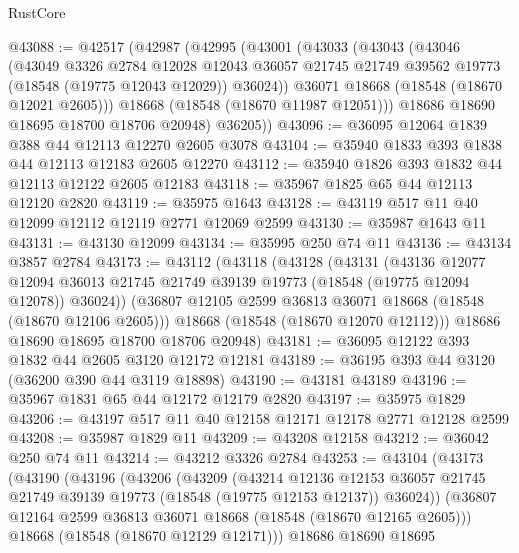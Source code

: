 \begin{lexlean}{RustCore}
\begin{coremodule}
@43088 := @42517
    (@42987
      (@42995
        (@43001
          (@43033
            (@43043
              (@43046
                (@43049
                  @3326
                  @2784
                  @12028
                  @12043
                  @36057
                  @21745
                  @21749
                  @39562
                  @19773
                  (@18548 (@19775 @12043 @12029))
                  @36024))
              @36071
              @18668
              (@18548 (@18670 @12021 @2605)))
            @18668
            (@18548 (@18670 @11987 @12051)))
          @18686
          @18690
          @18695
          @18700
          @18706
          @20948)
        @36205))
@43096 := @36095 @12064 @1839 @388 @44 @12113 @12270 @2605 @3078
@43104 := @35940 @1833 @393 @1838 @44 @12113 @12183 @2605 @12270
@43112 := @35940 @1826 @393 @1832 @44 @12113 @12122 @2605 @12183
@43118 := @35967 @1825 @65 @44 @12113 @12120 @2820
@43119 := @35975 @1643
@43128 := @43119 @517 @11 @40 @12099 @12112 @12119 @2771 @12069 @2599
@43130 := @35987 @1643 @11
@43131 := @43130 @12099
@43134 := @35995 @250 @74 @11
@43136 := @43134 @3857 @2784
@43173 := @43112
    (@43118
      (@43128
        (@43131
          (@43136
            @12077
            @12094
            @36013
            @21745
            @21749
            @39139
            @19773
            (@18548 (@19775 @12094 @12078))
            @36024))
        (@36807 @12105 @2599 @36813 @36071 @18668 (@18548 (@18670 @12106 @2605)))
        @18668
        (@18548 (@18670 @12070 @12112)))
      @18686
      @18690
      @18695
      @18700
      @18706
      @20948)
@43181 := @36095 @12122 @393 @1832 @44 @2605 @3120 @12172 @12181
@43189 := @36195 @393 @44 @3120 (@36200 @390 @44 @3119 @18898)
@43190 := @43181 @43189
@43196 := @35967 @1831 @65 @44 @12172 @12179 @2820
@43197 := @35975 @1829
@43206 := @43197 @517 @11 @40 @12158 @12171 @12178 @2771 @12128 @2599
@43208 := @35987 @1829 @11
@43209 := @43208 @12158
@43212 := @36042 @250 @74 @11
@43214 := @43212 @3326 @2784
@43253 := @43104
    (@43173
      (@43190
        (@43196
          (@43206
            (@43209
              (@43214
                @12136
                @12153
                @36057
                @21745
                @21749
                @39139
                @19773
                (@18548 (@19775 @12153 @12137))
                @36024))
            (@36807 @12164 @2599 @36813 @36071 @18668 (@18548 (@18670 @12165 @2605)))
            @18668
            (@18548 (@18670 @12129 @12171)))
          @18686
          @18690
          @18695

\end{coremodule}
\end{lexlean}
